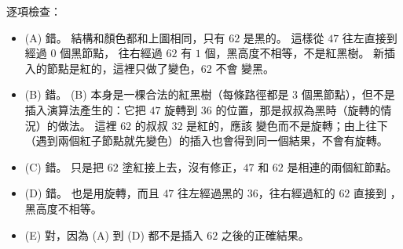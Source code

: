 \begin{pastsoln}
逐項檢查：
\begin{itemize}
\item (A) 錯。 結構和顏色都和上圖相同，只有 $62$ 是黑的。 這樣從 $47$ 往左直接到 \NIL 經過 $0$ 個黑節點，
往右經過 $62$ 有 $1$ 個，黑高度不相等，不是紅黑樹。 新插入的節點是紅的，這裡只做了變色，$62$ 不會
變黑。
\item (B) 錯。 (B) 本身是一棵合法的紅黑樹（每條路徑都是 $3$ 個黑節點），但不是插入演算法產生的：它把
$47$ 旋轉到 $36$ 的位置，那是叔叔為黑時（旋轉的情況）的做法。 這裡 $62$ 的叔叔 $32$ 是紅的，應該
變色而不是旋轉；由上往下（遇到兩個紅子節點就先變色）的插入也會得到同一個結果，不會有旋轉。
\item (C) 錯。 只是把 $62$ 塗紅接上去，沒有修正，$47$ 和 $62$ 是相連的兩個紅節點。
\item (D) 錯。 也是用旋轉，而且 $47$ 往左經過黑的 $36$，往右經過紅的 $62$ 直接到 \NIL，黑高度不相等。
\item (E) 對，因為 (A) 到 (D) 都不是插入 $62$ 之後的正確結果。
\end{itemize}
\end{pastsoln}
